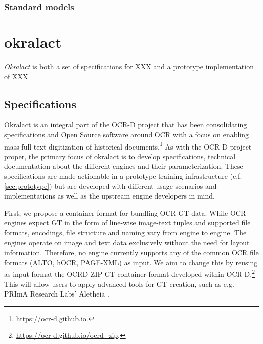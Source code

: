 \documentclass[conference]{IEEEtran}
\begin{document}

\subsubsection{Standard models}




\section{okralact}

\textit{Okralact} is both a set of specifications for XXX and a prototype
implementation of XXX.

\subsection{Specifications}

Okralact is an integral part of the OCR-D project that has been
consolidating specifications and Open Source software around OCR
with a focus on enabling mass full text digitization of historical
documents.\footnote{\url{https://ocr-d.github.io}.} As with the
OCR-D project proper, the primary focus of okralact is to develop
specifications, technical documentation about the different engines
and their parameterization. These specifications are made
actionable in a prototype training infrastructure (c.f.
\ref{sec:prototype}) but are developed with different usage
scenarios and implementations as well as the upstream engine
developers in mind.

First, we propose a container format for bundling OCR GT data.
While OCR engines expect GT in the form of line-wise image-text
tuples and supported file formats, encodings, file structure and
naming vary from engine to engine. The engines operate on image and
text data exclusively without the need for layout information.
Therefore, no engine currently supports any of the common OCR
file formats (ALTO, hOCR, PAGE-XML) as input. We aim to change this by
reusing as input format the OCRD-ZIP GT container format developed within
OCR-D.\footnote{\url{https://ocr-d.github.io/ocrd_zip}.} \cite{boenig2019datech} This will
allow users to apply advanced tools for GT creation, such as e.g. 
PRImA Research Labs' Aletheia \cite{clausner2011aletheia}.
\end{document}
